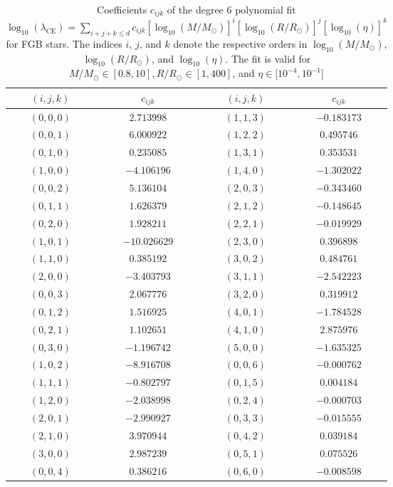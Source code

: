 \begin{table}
\centering
\caption{Coefficients $c_{ijk}$ of the degree 6 polynomial fit $\log_{10}(\lambda_{\mathrm{CE}})=\sum_{i+j+k\leq d}c_{ijk}\left[\log_{10}(M/M_\odot)\right]^i\left[\log_{10}(R/R_\odot)\right]^j\left[\log_{10}(\eta)\right]^k$ for FGB stars. The indices $i$, $j$, and $k$ denote the respective orders in $\log_{10}(M/M_\odot)$, $\log_{10}(R/R_\odot)$, and $\log_{10}(\eta)$. The fit is valid for $M/M_\odot\in[0.8,10], R/R_\odot\in[1,400]$, and $\eta\in[10^{-4},10^{-1}$]}
\label{tab:lambda_ce_3d_coef_FGB}
\begin{tabular}{cc@{\qquad}cc}
\hline
$(i,j,k)$ & $c_{ijk}$ & $(i,j,k)$ & $c_{ijk}$ \\
\hline
$(0,0,0)$ & $2.713998$ & $(1,1,3)$ & $-0.183173$ \\
$(0,0,1)$ & $6.000922$ & $(1,2,2)$ & $0.495746$ \\
$(0,1,0)$ & $0.235085$ & $(1,3,1)$ & $0.353531$ \\
$(1,0,0)$ & $-4.106196$ & $(1,4,0)$ & $-1.302022$ \\
$(0,0,2)$ & $5.136104$ & $(2,0,3)$ & $-0.343460$ \\
$(0,1,1)$ & $1.626379$ & $(2,1,2)$ & $-0.148645$ \\
$(0,2,0)$ & $1.928211$ & $(2,2,1)$ & $-0.019929$ \\
$(1,0,1)$ & $-10.026629$ & $(2,3,0)$ & $0.396898$ \\
$(1,1,0)$ & $0.385192$ & $(3,0,2)$ & $0.484761$ \\
$(2,0,0)$ & $-3.403793$ & $(3,1,1)$ & $-2.542223$ \\
$(0,0,3)$ & $2.067776$ & $(3,2,0)$ & $0.319912$ \\
$(0,1,2)$ & $1.516925$ & $(4,0,1)$ & $-1.784528$ \\
$(0,2,1)$ & $1.102651$ & $(4,1,0)$ & $2.875976$ \\
$(0,3,0)$ & $-1.196742$ & $(5,0,0)$ & $-1.635325$ \\
$(1,0,2)$ & $-8.916708$ & $(0,0,6)$ & $-0.000762$ \\
$(1,1,1)$ & $-0.802797$ & $(0,1,5)$ & $0.004184$ \\
$(1,2,0)$ & $-2.038998$ & $(0,2,4)$ & $-0.000703$ \\
$(2,0,1)$ & $-2.990927$ & $(0,3,3)$ & $-0.015555$ \\
$(2,1,0)$ & $3.970944$ & $(0,4,2)$ & $0.039184$ \\
$(3,0,0)$ & $2.987239$ & $(0,5,1)$ & $0.075526$ \\
$(0,0,4)$ & $0.386216$ & $(0,6,0)$ & $-0.008598$ \\

\end{tabular}
\end{table}

